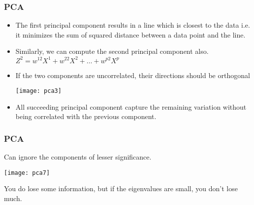 \begin{frame}[fragile] \frametitle{PCA} 

\begin{itemize}
\item The first principal component results in a line which is closest to the data i.e. it minimizes the sum of squared distance between a data point and the line.
\item Similarly, we can compute the second principal component also.
$Z^2 = w^{12}X^1 + w^{22}X^2 + \ldots +  w^{p2}X^p$
\item If the two components are uncorrelated, their directions should be orthogonal
\begin{center}
\texttt{[image: pca3]}
\end{center}
\item All succeeding principal component capture the remaining variation without being correlated with the previous component. 
\end{itemize}

\end{frame}


\begin{frame}[fragile] \frametitle{PCA} 
Can ignore the components of lesser significance.
\begin{center}
\texttt{[image: pca7]}
\end{center}
You do lose some information, but if the eigenvalues are small, you don't lose 
much.
\end{frame}

%
%

